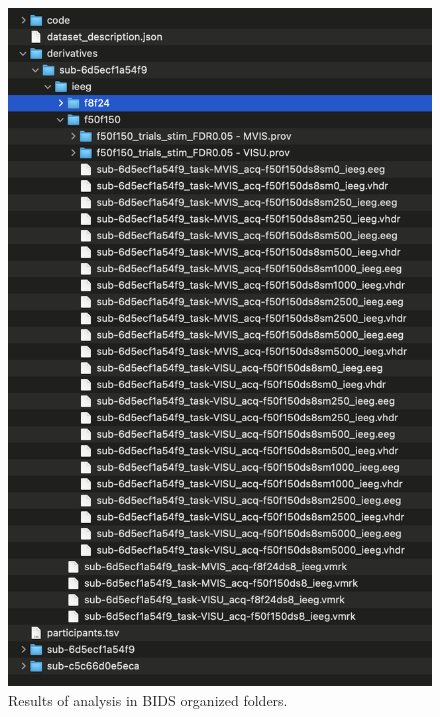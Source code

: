 \documentclass[a4paper]{article}
\begin{document}
\begin{figure}[H]
\begin{center}
\includegraphics[scale=0.6]{BidsDerivativesAfterAnalysis.png}
\end{center}
\caption{\label{ResultBidsSubjectDerivatives}Results of analysis in BIDS organized folders.}
\end{figure}
\end{document}

